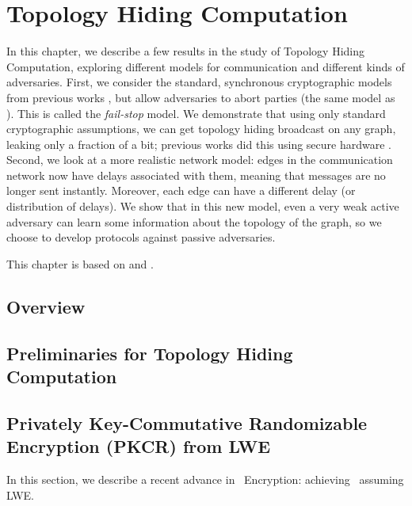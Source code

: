 \chapter{Topology Hiding Computation}
In this chapter, we describe a few results in the study of Topology Hiding Computation, exploring different models for communication and different kinds of adversaries. First, we consider the standard, synchronous cryptographic models from previous works \cite{EC:AkaMor17,C:AkaLaVMor17}, but allow adversaries to abort parties (the same model as \cite{BBMM18}). This is called the \emph{fail-stop} model. We demonstrate that using only standard cryptographic assumptions, we can get topology hiding broadcast on any graph, leaking only a fraction of a bit; previous works did this using secure hardware \cite{BBMM18}. Second, we look at a more realistic network model: edges in the communication network now have delays associated with them, meaning that messages are no longer sent instantly. Moreover, each edge can have a different delay (or distribution of delays). We show that in this new model, even a very weak active adversary can learn some information about the topology of the graph, so we choose to develop protocols against passive adversaries.

This chapter is based on \cite{LLMMMT18} and \cite{LLMMMT20}.

\section{Overview}


\section{Preliminaries for Topology Hiding Computation}\label{sec:prelim}



\section{Privately Key-Commutative Randomizable Encryption (PKCR) from LWE}
In this section, we describe a recent advance in \PKCR~Encryption: achieving \PKCR~assuming LWE.



